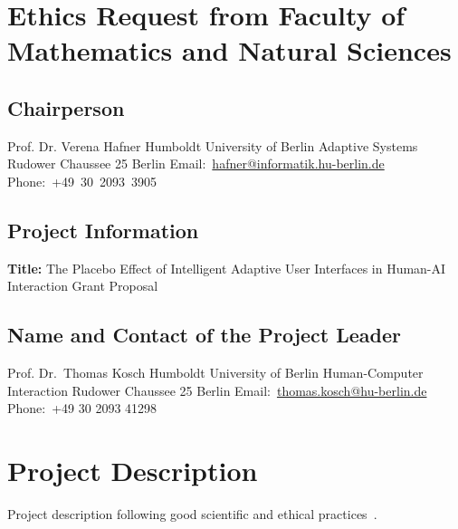 \documentclass[letterpaper]{article}
\title{}
\author{Thomas Kosch}
\date{2023-06-22}
\newcommand\textstyleHyperlink[1]{\textcolor[rgb]{0.019607844,0.3882353,0.75686276}{#1}}
\begin{document}
\clearpage\clearpage\pagestyle{MP}
\section{Ethics Request from Faculty of Mathematics and Natural Sciences}

\bigskip

\subsection{Chairperson}
Prof. Dr. Verena Hafner\newline
Humboldt University of Berlin\newline
Adaptive Systems\newline
Rudower Chaussee 25 Berlin\newline
Email:\ \href{mailto:hafner@informatik.hu-berlin.de}{\textstyleHyperlink{hafner@informatik.hu-berlin.de}}\newline
Phone:\ +49\ 30\ 2093\ 3905


\bigskip

\subsection{Project Information}
{\bfseries Title:} The Placebo Effect of Intelligent Adaptive User Interfaces in Human-AI Interaction \newline
{} Grant Proposal

\subsection{Name and Contact of the Project Leader}
Prof. Dr.\ Thomas Kosch\newline
Humboldt University of Berlin\newline
Human-Computer Interaction\newline
Rudower Chaussee 25 Berlin\newline
Email:\ \href{mailto:thomas.kosch@hu-berlin.de}{\textstyleHyperlink{thomas.kosch@hu-berlin.de}}\ \newline
\textcolor[rgb]{0.2,0.2,0.2}{Phone:\ }+49 30 2093 41298

\clearpage

\section{Project Description}
Project description following good scientific and ethical practices~\cite{greene2019better}.
\end{document}
